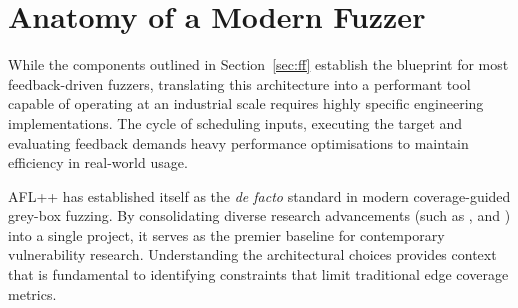 \chapter{Anatomy of a Modern Fuzzer}
\label{ch:afl}

While the components outlined in Section~\ref{sec:ff} establish the blueprint for most feedback-driven fuzzers, translating this architecture into a performant tool capable of operating at an industrial scale requires highly specific engineering implementations. The cycle of scheduling inputs, executing the target and evaluating feedback demands heavy performance optimisations to maintain efficiency in real-world usage.

AFL++ \cite{fioraldi2020afl++} has established itself as the \textit{de facto} standard in modern coverage-guided grey-box fuzzing. By consolidating diverse research advancements (such as \cite{aschermann2020ijon}, \cite{aschermann2019redqueen} and \cite{bohme2016coverage}) into a single project, it serves as the premier baseline for contemporary vulnerability research. Understanding the architectural choices provides context that is fundamental to identifying constraints that limit traditional edge coverage metrics.





